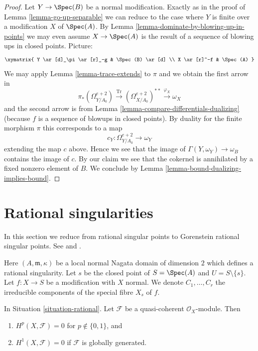 \begin{proof}
\medskip\noindent
Let $Y \to \Spec(B)$ be a normal modification. Exactly as in the proof of
Lemma \ref{lemma-go-up-separable} we can reduce to the case where $Y$
is finite over a modification $X$ of $\Spec(A)$. By
Lemma \ref{lemma-dominate-by-blowing-up-in-points} we may
even assume $X \to \Spec(A)$ is the result of a sequence of
blowing ups in closed points. Picture:
$$
\xymatrix{
Y \ar[d]_\pi \ar[r]_-g & \Spec(B) \ar[d] \\
X \ar[r]^-f & \Spec(A)
}
$$
We may apply Lemma \ref{lemma-trace-extends} to $\pi$ and
we obtain the first arrow in
$$
\pi_*(\Omega^{e + 2}_{Y/A_0})
\xrightarrow{\text{Tr}}
(\Omega^{e + 2}_{X/A_0})^{**}
\xrightarrow{\varphi_X}
\omega_X
$$
and the second arrow is from
Lemma \ref{lemma-compare-differentials-dualizing}
(because $f$ is a sequence of blowups in closed points).
By duality for the finite morphism $\pi$ this corresponds to a map
$$
c_Y : \Omega^{e + 2}_{Y/A_0} \longrightarrow \omega_Y
$$
extending the map $c$ above. Hence we see that the image of
$\Gamma(Y, \omega_Y) \to \omega_B$ contains the image of $c$.
By our claim we see that the cokernel is annihilated by
a fixed nonzero element of $B$. We conclude by
Lemma \ref{lemma-bound-dualizing-implies-bound}.
\end{proof}






\section{Rational singularities}
\label{section-rational-singularities}

\noindent
In this section we reduce from rational singular points to
Gorenstein rational singular points. See \cite{Lipman-rational} and
\cite{Mattuck}.

\begin{situation}
\label{situation-rational}
Here $(A, \mathfrak m, \kappa)$ be a local normal Nagata domain of
dimension $2$ which defines a rational singularity. Let $s$ be the closed
point of $S = \Spec(A)$ and $U = S \setminus \{s\}$. Let $f : X \to S$
be a modification with $X$ normal.
We denote $C_1, \ldots, C_r$ the irreducible
components of the special fibre $X_s$ of $f$.
\end{situation}

\begin{lemma}
\label{lemma-globally-generated}
In Situation \ref{situation-rational}.
Let $\mathcal{F}$ be a quasi-coherent $\mathcal{O}_X$-module. Then
\begin{enumerate}
\item $H^p(X, \mathcal{F}) = 0$ for $p \not \in \{0, 1\}$, and
\item $H^1(X, \mathcal{F}) = 0$ if $\mathcal{F}$ is globally generated.
\end{enumerate}
\end{lemma}

